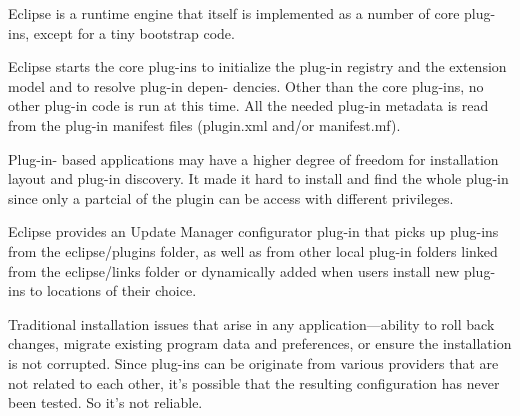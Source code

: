 \documentclass[12pt,letterpaper,boxed]{hmcpset}
\begin{document}
\begin{problem}
\end{problem}

Eclipse is a runtime engine that itself is implemented as a number of core plug-ins, except for a tiny bootstrap code. 
\newline

\begin{problem}
\end{problem}

Eclipse starts the core plug-ins to initialize the plug-in registry and the extension model and to resolve plug-in depen- dencies. Other than the core plug-ins, no other plug-in code is run at this time. All the needed plug-in metadata is read from the plug-in manifest files (plugin.xml and/or manifest.mf).

\begin{problem}
\end{problem}

Plug-in- based applications may have a higher degree of freedom for installation layout and plug-in discovery. It made it hard to install and find the whole plug-in since only a partcial of the plugin can be access with different privileges.
\newline

\begin{problem}
\end{problem}

Eclipse provides an Update Manager configurator plug-in that picks up plug-ins from the eclipse/plugins folder, as well as from other local plug-in folders linked from the eclipse/links folder or dynamically added when users install new plug-ins to locations of their choice.
\newline

\begin{problem}
\end{problem}

Traditional installation issues that arise in any application—ability to roll back changes, migrate existing program data and preferences, or ensure the installation is not corrupted. \newline
Since plug-ins can be originate from various providers that are not related to each other, it's possible that the resulting configuration has never been tested. So it's not reliable.\newline
\end{document}
